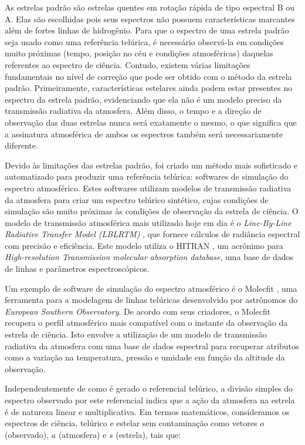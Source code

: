 As estrelas padrão são estrelas quentes em rotação rápida de tipo espectral B ou A. Elas são escolhidas pois seus espectros não possuem características marcantes além de fortes linhas de hidrogênio. Para que o espectro de uma estrela padrão seja usado como uma referência telúrica, é necessário observá-la em condições muito próximas (tempo, posição no céu e condições atmosféricas) daquelas referentes ao espectro de ciência. Contudo, existem várias limitações fundamentais no nível de correção que pode ser obtido com o método da estrela padrão. Primeiramente, características estelares ainda podem estar presentes no espectro da estrela padrão, evidenciando que ela não é um modelo preciso da transmissão radiativa da atmosfera. Além disso, o tempo e a direção de observação das duas estrelas nunca será exatamente o mesmo, o que significa que a assinatura atmosférica de ambos os espectros também será necessariamente diferente.

Devido às limitações das estrelas padrão, foi criado um método mais sofisticado e automatizado para produzir uma referência telúrica: softwares de simulação do espectro atmosférico. Estes softwares utilizam modelos de transmissão radiativa da atmosfera para criar um espectro telúrico sintético, cujas condições de simulação são muito próximas às condições de observação da estrela de ciência. O modelo de transmissão atmosférica mais utilizado hoje em dia é o \textit{Line-By-Line Radiative Transfer Model (LBLRTM)} \citep{2005JQSRT..91..233C}, que fornece cálculos de radiância espectral com precisão e eficiência. Este modelo utiliza o HITRAN \citep{rothman2009hitran}, um acrônimo para \textit{High-resolution Transmission molecular absorption database}, uma base de dados de linhas e parâmetros espectroscópicos. 

Um exemplo de software de simulação do espectro atmosférico é o Molecfit \citep{smette2015molecfit}, uma ferramenta para a modelagem de linhas telúricas desenvolvido por astrônomos do \textit{European Southern Observatory}. De acordo com seus criadores, o Molecfit recupera o perfil atmosférico mais compatível com o instante da observação da estrela de ciência. Isto envolve a utilização de um modelo de transmissão radiativa da atmosfera com uma base de dados espectral para recuperar atributos como a variação na temperatura, pressão e umidade em função da altitude da observação.

Independentemente de como é gerado o referencial telúrico, 
a divisão simples do espectro observado por este referencial indica que a ação da atmosfera na estrela é de natureza linear e multiplicativa.  Em termos matemáticos, consideramos os espectros de ciência, telúrico e estelar sem contaminação como vetores $o$ (observado), $a$ (atmosfera) e $s$ (estrela), tais que:

